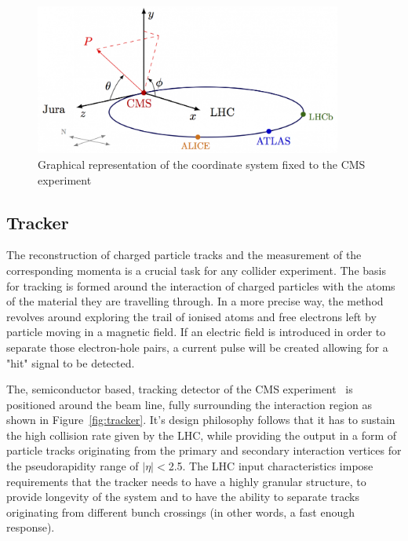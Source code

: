 \begin{figure}[htbp]
  \centering
    \includegraphics[width=0.9\textwidth]{CMS_experiment/cms_coordinate_system.png}
  \caption[Graphical representation of the coordinate system fixed to the CMS experiment.]{Graphical representation of the coordinate system fixed to the CMS experiment~\cite{coord_syst}}
  \label{fig:cms_coord_syst}
\end{figure}




\subsection{Tracker}
\hspace{10pt} The reconstruction of charged particle tracks and the measurement of the corresponding momenta is a crucial task for any collider experiment. The basis for tracking is formed around the interaction of charged particles with the atoms of the material they are travelling through. In a more precise way, the method revolves around exploring the trail of ionised atoms and free electrons left by particle moving in a magnetic field. If an electric field is introduced in order to separate those electron-hole pairs, a current pulse will be created allowing for a "hit" signal to be detected.

\hspace{10pt} The, semiconductor based, tracking detector of the CMS experiment~\cite{cms:tdr,tracker_performance,Tracker:scheme} is positioned around the beam line, fully surrounding the interaction region as shown in Figure~\ref{fig:tracker}. It's design philosophy follows that it has to sustain the high collision rate given by the LHC, while providing the output in a form of particle tracks originating from the primary and secondary interaction vertices for the pseudorapidity range of $|\eta|<$2.5. The LHC input characteristics impose requirements that the tracker needs to have a highly granular structure, to provide longevity of the system and to have the ability to separate tracks originating from different bunch crossings (in other words, a fast enough response).

